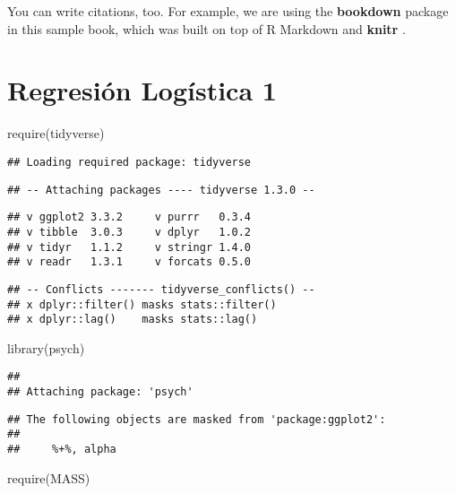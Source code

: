 \documentclass[
]{book}
\newenvironment{Shaded}{\begin{snugshade}}{\end{snugshade}}
\newcommand{\FunctionTok}[1]{\textcolor[rgb]{0.00,0.00,0.00}{#1}}
\newcommand{\NormalTok}[1]{#1}
\begin{document}
You can write citations, too. For example, we are using the \textbf{bookdown} package \citep{R-bookdown} in this sample book, which was built on top of R Markdown and \textbf{knitr} \citep{xie2015}.

\hypertarget{regresiuxf3n-loguxedstica-1}{%
\chapter{Regresión Logística 1}\label{regresiuxf3n-loguxedstica-1}}

\begin{Shaded}
\begin{Highlighting}[]
\FunctionTok{require}\NormalTok{(tidyverse)}
\end{Highlighting}
\end{Shaded}

\begin{verbatim}
## Loading required package: tidyverse
\end{verbatim}

\begin{verbatim}
## -- Attaching packages ---- tidyverse 1.3.0 --
\end{verbatim}

\begin{verbatim}
## v ggplot2 3.3.2     v purrr   0.3.4
## v tibble  3.0.3     v dplyr   1.0.2
## v tidyr   1.1.2     v stringr 1.4.0
## v readr   1.3.1     v forcats 0.5.0
\end{verbatim}

\begin{verbatim}
## -- Conflicts ------- tidyverse_conflicts() --
## x dplyr::filter() masks stats::filter()
## x dplyr::lag()    masks stats::lag()
\end{verbatim}

\begin{Shaded}
\begin{Highlighting}[]
\FunctionTok{library}\NormalTok{(psych)}
\end{Highlighting}
\end{Shaded}

\begin{verbatim}
## 
## Attaching package: 'psych'
\end{verbatim}

\begin{verbatim}
## The following objects are masked from 'package:ggplot2':
## 
##     %+%, alpha
\end{verbatim}

\begin{Shaded}
\begin{Highlighting}[]
\FunctionTok{require}\NormalTok{(MASS)}
\end{Highlighting}
\end{Shaded}
\end{document}
